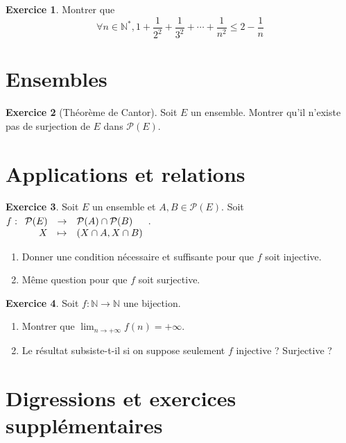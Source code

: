 \documentclass[12pt,a4paper]{book}
\theoremstyle{definition}
\newtheorem{exo}{Exercice}[section]
\theoremstyle{remark}
\newcommand{\N}{\mathbb{N}}
\newcommand{\applic}[4]{\begin{array}[t]{rcl}
#1 & \to & #2 \\
#3 & \mapsto & #4
\end{array}}
\begin{document}
\begin{exo}
    Montrer que
    \[
    \forall n \in \N^*, 1 + \frac{1}{2^2} + \frac{1}{3^2} + \cdots + \frac{1}{n^2} \le 2 - \frac{1}{n}
    \]
\end{exo}

\section{Ensembles}

\begin{exo}[Théorème de Cantor]
    Soit $E$ un ensemble. Montrer qu'il n'existe pas de surjection de $E$ dans $\mathcal{P}(E)$.
\end{exo}

\section{Applications et relations}

\begin{exo}
    Soit $E$ un ensemble et $A,B \in \mathcal{P}(E)$. Soit $f : \applic{\mathcal{P}(E)}{\mathcal{P}(A) \cap \mathcal{P}(B)}{X}{(X\cap A, X \cap B)}$.
    \begin{enumerate}
        \item Donner une condition nécessaire et suffisante pour que $f$ soit injective.
        \item Même question pour que $f$ soit surjective.
    \end{enumerate}
\end{exo}

\begin{exo}
    Soit $f : \N \to \N$ une bijection.
    \begin{enumerate}
        \item Montrer que $\lim_{n\to+\infty} f(n) = +\infty$.
        \item Le résultat subsiste-t-il si on suppose seulement $f$ injective ? Surjective ?
    \end{enumerate} 
\end{exo}

\section{Digressions et exercices supplémentaires}
\end{document}
